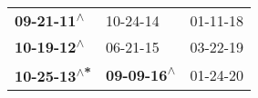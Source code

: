 \begin{supertabular}{lll}
  \textbf{09-21-11\textsuperscript{$\wedge$}} &                   10-24-14\textsuperscript{} &  01-11-18\textsuperscript{} \\
  \textbf{10-19-12\textsuperscript{$\wedge$}} &                   06-21-15\textsuperscript{} &  03-22-19\textsuperscript{} \\
 \textbf{10-25-13\textsuperscript{$\wedge$*}} &  \textbf{09-09-16\textsuperscript{$\wedge$}} &  01-24-20\textsuperscript{} \\
\end{supertabular}
